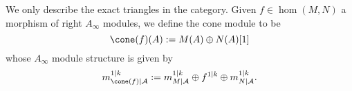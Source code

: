 
 
 
We only describe the exact triangles in the category. Given $f\in \hom(M, N)$ a morphism of right $A_\infty$ modules, we define the cone module to be 
\[\cone(f)(A):=M(A)\oplus N(A)[1]\]
whose $A_\infty$ module structure is given by 
\[ m^{1|k}_{\cone(f)|\mathcal A}:=m^{1|k}_{M|\mathcal A}\oplus f^{1|k}\oplus m^{1|k}_{N|\mathcal A}.\]

 